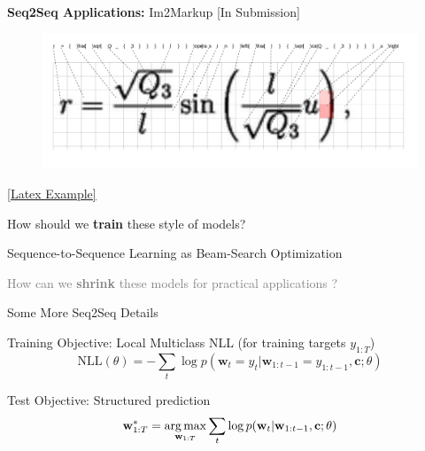 \documentclass{beamer}
\let\tempone\itemize
\let\temptwo\enditemize
\renewenvironment{itemize}{\tempone\addtolength{\itemsep}{0.5\baselineskip}}{\temptwo}
\newcommand{\air}{\vspace{0.25cm}}
\newcommand{\mair}{\vspace{-0.25cm}}
\newcommand{\wvec}{\mathbf{w}}
\newcommand{\cvec}{\mathbf{c}}
\newcommand{\Cite}[1]{{\footnotesize \citep{#1}}}
\def\argmax{\operatornamewithlimits{arg\,max}}
\def\argmax{\operatornamewithlimits{arg\,max}}
\begin{document}
\begin{frame}
  \centerline{\textbf{Seq2Seq Applications:} \alert{Im2Markup} [In Submission] }
  
  
  \begin{figure}
    \includegraphics[width=\textwidth]{math}
  \end{figure}

  \mair

  \begin{figure}
    \centering
  \end{figure}
  \centerline{\href{http://localhost:8900/}{[Latex Example]}}
\end{frame}


\begin{frame}
  \centerline{}
  \air 
  \air

  \begin{itemize}

  \item  How should we \textbf{train} these style of models? 
    \air 

    \begin{center}
      \alert{Sequence-to-Sequence Learning as Beam-Search
        Optimization}

      \Cite{Wiseman2016a}
    \end{center}


    \air 
  \item \textcolor{gray}{ How can we \textbf{shrink} these models for practical applications \Cite{Kim2016a}? }
  \end{itemize}
\end{frame}

\begin{frame}
  \centerline{Some More Seq2Seq \alert{Details} }
  \air 
  \air

  Training Objective: Local Multiclass NLL (for training targets $y_{1:T}$)
  \[ \text{NLL}(\theta) = -\sum_{t} \log p(\wvec_{t} = y_t | \wvec_{1:t-1} = y_{1:t-1}, \cvec; \theta) \] 

  \air

  Test Objective:  Structured prediction
  \[ \wvec^*_{1:T} = \argmax_{\wvec_{1:T}} \sum_{t} \log p(\wvec_{t} | \wvec_{1:t-1}, \cvec; \theta) \] 
\end{frame}
\end{document}
